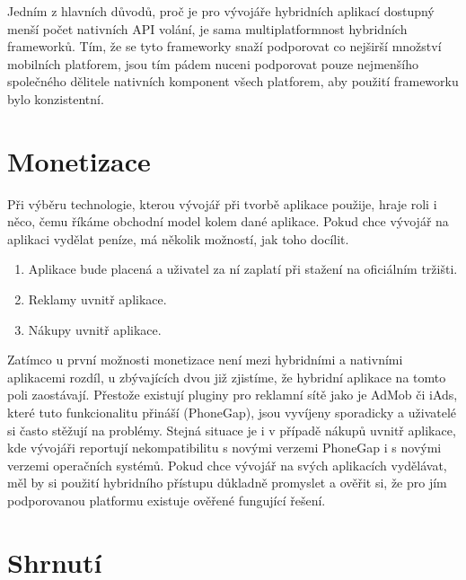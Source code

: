 Jedním z hlavních důvodů, proč je pro vývojáře hybridních aplikací dostupný menší počet nativních API volání, je sama multiplatformnost hybridních frameworků. Tím, že se tyto frameworky snaží podporovat co nejširší množství mobilních platforem, jsou tím pádem nuceni podporovat pouze nejmenšího společného dělitele nativních komponent všech platforem, aby použití frameworku bylo konzistentní.

\section{Monetizace}
Při výběru technologie, kterou vývojář při tvorbě aplikace použije, hraje roli i něco, čemu říkáme obchodní model kolem dané aplikace. Pokud chce vývojář na aplikaci vydělat peníze, má několik možností, jak toho docílit.

\begin{enumerate}
	\item Aplikace bude placená a uživatel za ní zaplatí při stažení na oficiálním tržišti.
	\item Reklamy uvnitř aplikace.
	\item Nákupy uvnitř aplikace.
\end{enumerate}

Zatímco u první možnosti monetizace není mezi hybridními a nativními aplikacemi rozdíl, u zbývajících dvou již zjistíme, že hybridní aplikace na tomto poli zaostávají. Přestože existují pluginy pro reklamní sítě jako je AdMob či iAds, které tuto funkcionalitu přináší (PhoneGap), jsou vyvíjeny sporadicky a uživatelé si často stěžují na problémy. Stejná situace je i v případě nákupů uvnitř aplikace, kde vývojáři reportují nekompatibilitu s novými verzemi PhoneGap i s novými verzemi operačních systémů. Pokud chce vývojář na svých aplikacích vydělávat, měl by si použití hybridního přístupu důkladně promyslet a ověřit si, že pro jím podporovanou platformu existuje ověřené fungující řešení.

\section{Shrnutí}

